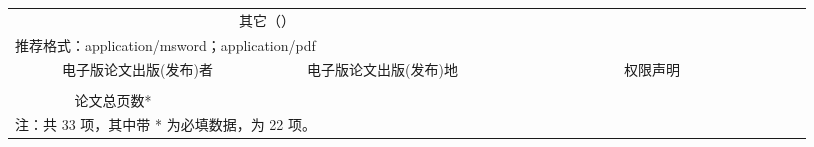 \documentclass[a4paper,12pt,oneside,openany]{book}
\begin{document}
\begin{CJK}{UTF8}{hei}
\begin{table}[tbph]
\begin{tabular}{|ccccccccccc|c|ccc|cc|c||c|c||c||c||c|c|cccc|cc|c|ccccc|cc|c|cccc|cc|ccc|c|ccc|cccc|cccc|}
 &  &  &  &  &  &  &  &  &  & \multicolumn{1}{c}{} & \multicolumn{1}{c}{} &  &  & \multicolumn{1}{c}{} &  & \multicolumn{8}{c}{其它（\quad{}）} &  &  &  & \multicolumn{1}{c}{} &  & \multicolumn{1}{c}{} & \multicolumn{1}{c}{} &  &  &  &  & \multicolumn{1}{c}{} &  & \multicolumn{1}{c}{} & \multicolumn{1}{c}{} &  &  &  & \multicolumn{1}{c}{} &  & \multicolumn{1}{c}{} &  &  & \multicolumn{1}{c}{} & \multicolumn{1}{c}{} &  &  & \multicolumn{1}{c}{} &  &  &  & \multicolumn{1}{c}{} &  &  &  & \tabularnewline
\multicolumn{60}{|l|}{推荐格式：application/msword；application/pdf }\tabularnewline
\hline 
\multicolumn{19}{|c|}{电子版论文出版(发布)者} & \multicolumn{19}{c|}{电子版论文出版(发布)地} & \multicolumn{22}{c|}{权限声明}\tabularnewline
\hline 
\multicolumn{19}{|c|}{} & \multicolumn{19}{c|}{} & \multicolumn{22}{c|}{}\tabularnewline
\hline 
\multicolumn{15}{|c|}{论文总页数{*}} & \multicolumn{45}{c|}{}\tabularnewline
\hline 
\multicolumn{60}{|l|}{注：共 33 项，其中带 {*} 为必填数据，为 22 项。}\tabularnewline
\hline 
\end{tabular}
\end{table}

 
 
\clearpage 
\end{CJK} 
\end{document}
